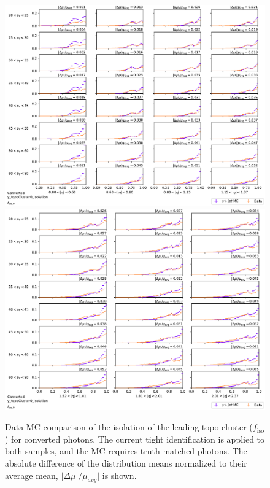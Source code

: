 \begin{figure}[!thp]
    \centering
    \includegraphics[width=.74\textwidth]{appendices/datamc_images/y_topoCluster0_isolation_Converted_lowerEta.pdf}
    \includegraphics[width=.74\textwidth]{appendices/datamc_images/y_topoCluster0_isolation_Converted_upperEta.pdf}
    \caption[Data-MC comparison of the isolation of the leading topo-cluster ($f_{\text{iso}}$) for converted photons]{Data-MC comparison of the isolation of the leading topo-cluster ($f_{\text{iso}}$) for converted photons. The current tight identification is applied to both samples, and the \gls{MC} requires truth-matched photons. The absolute difference of the distribution means normalized to their average mean, $|\Delta \mu|/\mu_{avg}|$ is shown.}
    \label{fig:dmc-c-iso}
\end{figure}
